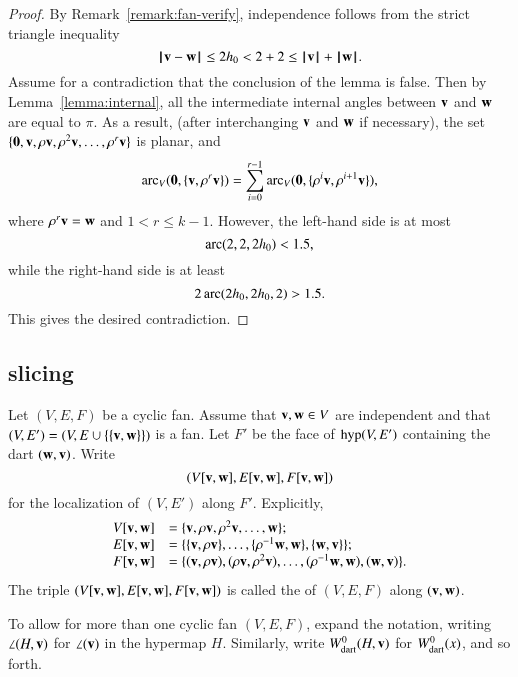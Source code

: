 \begin{proof} By Remark~\ref{remark:fan-verify}, independence follows from the strict triangle inequality
$$
\norm{\v}{\w} \le 2\hm < 2 + 2 \le \normo{\v} + \normo{\w}.
$$
Assume for a contradiction that the conclusion of the lemma is false.  Then by Lemma~\ref{lemma:internal}, all the intermediate internal angles between $\v$ and $\w$ are equal to $\pi$.  As a result, (after interchanging $\v$ and $\w$ if necessary), the set $\{\orz,\v,\rho\v,\rho^2\v,\ldots,\rho^r\v\}$ is planar, and
$$
\arc_V(\orz,\{\v,\rho^r\v\}) = \sum_{i=0}^{r-1} \arc_V(\orz,\{\rho^i\v,\rho^{i+1}\v\}),
$$
where $\rho^r \v = \w$ and $1 < r \le k-1$.
However, the left-hand side is at most
$$
\arc(2,2,2\hm) < 1.5,
$$
while the right-hand side is at least
$$
2\arc(2\hm,2\hm,2) > 1.5.
$$
This gives the desired contradiction.
\end{proof}

\subsection{slicing}

\begin{definition}[slice] Let $(V,E,F)$ be a cyclic fan.  Assume that $\v,\w\in V$ are
independent  and that
$(V,E')=(V,E\cup \{\{\v,\w\}\})$ is a fan.  Let $F'$ be the face of $\op{hyp}(V,E')$ 
containing the dart $(\w,\v)$.  Write
$$(V[\v,\w],E[\v,\w],F[\v,\w])$$
for the localization of $(V,E')$ along $F'$.  Explicitly,
$$
\begin{array}{lll}
V[\v,\w] &= \{\v,\rho \v,\rho^2 \v,\ldots,\w\};\\
E[\v,\w] &= \{\{\v,\rho \v\},\ldots,\{\rho^{-1}\w,\w\},\{\w,\v\}\};\\
F[\v,\w] &= \{(\v,\rho \v),(\rho \v,\rho^2 \v),\ldots,(\rho^{-1}\w,\w),(\w,\v)\}.
\end{array}
$$
The triple $(V[\v,\w],E[\v,\w],F[\v,\w])$ is called the  of $(V,E,F)$ along
$(\v,\w)$.
\end{definition}
%

To allow for more than one cyclic fan $(V,E,F)$,  expand the notation, writing $\angle(H,\v)$ for $\angle(\v)$ in the hypermap $H$.  Similarly, write $\Wdart(H,\v)$ for $\Wdart(x)$, and so forth.
%
%


